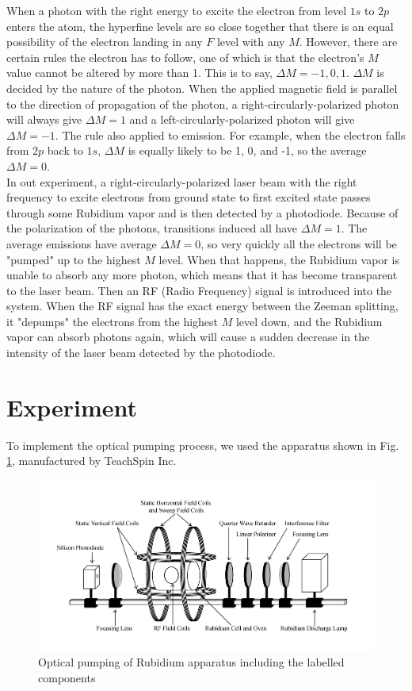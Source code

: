 \documentclass[prb,preprint]{revtex4-1}
\begin{document}
When a photon with the right energy to excite the electron from level $1s$ to $2p$ enters the atom, the hyperfine levels are so close together that there is an equal possibility of the electron landing in any $F$ level with any $M$. However, there are certain rules the electron has to follow, one of which is that the electron's $M$ value cannot be altered by more than 1. This is to say, $\Delta M=-1, 0, 1$. $\Delta M$ is decided by the nature of the photon. When the applied magnetic field is parallel to the direction of propagation of the photon, a right-circularly-polarized photon will always give $\Delta M=1$ and a left-circularly-polarized photon will give $\Delta M=-1$. The rule also applied to emission. For example, when the electron falls from $2p$ back to $1s$, $\Delta M$ is equally likely to be 1, 0, and -1, so the average $\Delta M=0$. \\

In out experiment, a right-circularly-polarized laser beam with the right frequency to excite electrons from ground state to first excited state passes through some Rubidium vapor and is then detected by a photodiode. Because of the polarization of the photons, transitions induced all have $\Delta M=1$. The average emissions have average $\Delta M=0$, so very quickly all the electrons will be "pumped" up to the highest $M$ level. When that happens, the Rubidium vapor is unable to absorb any more photon, which means that it has become transparent to the laser beam. Then an RF (Radio Frequency) signal is introduced into the system. When the RF signal has the exact energy between the Zeeman splitting, it "depumps" the electrons from the highest $M$ level down, and the Rubidium vapor can absorb photons again, which will cause a sudden decrease in the intensity of the laser beam detected by the photodiode. \\

\section{Experiment}

To implement the optical pumping process, we used the apparatus shown in Fig. 
\ref{exp}, manufactured by TeachSpin Inc. \\

\begin{figure}[h]
\centering
\includegraphics[width=16cm]{exp.jpg}
\caption{Optical pumping of Rubidium apparatus including the labelled components}
\label{exp}
\end{figure}
\end{document}
